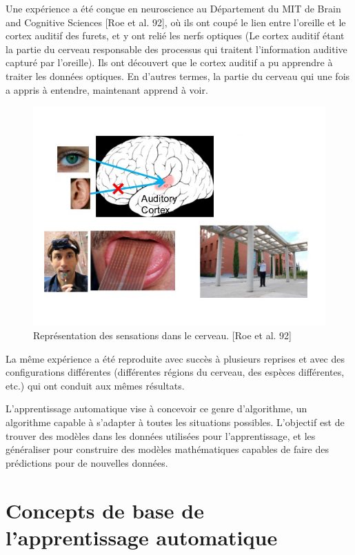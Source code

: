 	Une expérience a été conçue en neuroscience au Département du MIT de Brain and Cognitive Sciences [Roe et al. 92], où ils ont coupé le lien entre l'oreille et le cortex auditif des furets, et y ont relié les nerfs optiques (Le cortex auditif étant la partie du cerveau responsable des processus qui traitent l'information auditive capturé par l'oreille). Ils ont découvert que le cortex auditif a pu apprendre à traiter les données optiques. En d'autres termes, la partie du cerveau qui une fois a appris à entendre, maintenant apprend à voir.

\begin{figure}[H]
	\centering
		\includegraphics[width=5in]{Figures/OneLearningAlgoAndreNg.jpg}
	\caption[An Electron]{Représentation des sensations dans le cerveau. [Roe et al. 92]}
	\label{fig:Electron}
\end{figure}


	La même expérience a été reproduite avec succès à plusieurs reprises et avec des configurations différentes (différentes régions du cerveau, des espèces différentes, etc.) qui ont conduit aux mêmes résultats.

	L'apprentissage automatique vise à concevoir ce genre d'algorithme, un algorithme capable à s'adapter à toutes les situations possibles. L'objectif est de trouver des modèles dans les données utilisées pour l'apprentissage, et les généraliser pour construire des modèles mathématiques capables de faire des prédictions pour de nouvelles données.

\section{Concepts de base de l'apprentissage automatique}


